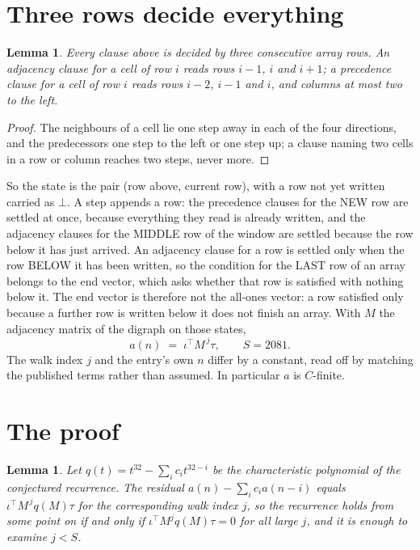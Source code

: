 \documentclass[11pt,a4paper]{article}
\theoremstyle{plain}
\newtheorem{lemma}[theorem]{Lemma}
\theoremstyle{definition}
\begin{document}
\section{Three rows decide everything}

\begin{lemma}\label{lem:win}
Every clause above is decided by three consecutive array rows. An adjacency clause for a cell
of row $i$ reads rows $i-1$, $i$ and $i+1$; a precedence clause for a cell of row $i$ reads
rows $i-2$, $i-1$ and $i$, and columns at most two to the left.
\end{lemma}

\begin{proof}
The neighbours of a cell lie one step away in each of the four directions, and the predecessors
one step to the left or one step up; a clause naming two cells in a row or column reaches two
steps, never more.
\end{proof}

So the state is the pair (row above, current row), with a row not yet written carried as
$\bot$. A step appends a row: the precedence clauses for the NEW row are settled at once,
because everything they read is already written, and the adjacency clauses for the MIDDLE row
of the window are settled because the row below it has just arrived. An adjacency clause for a row is settled only when the row BELOW it has been
written, so the condition for the LAST row of an array belongs to the end vector, which asks
whether that row is satisfied with nothing below it. The end vector is therefore not the
all-ones vector: a row satisfied only because a further row is written below it does not
finish an array. With $M$ the
adjacency matrix of the digraph on those states,
\[
a(n)\;=\;\iota^{\!\top}M^{\,j}\tau ,\qquad S=2081.
\]
The walk index $j$ and the entry's own $n$ differ by a constant, read off by matching the
published terms rather than assumed. In particular $a$ is $C$-finite.

\section{The proof}

\begin{lemma}\label{lem:crit}
Let $q(t)=t^{32}-\sum_i c_it^{32-i}$ be the characteristic polynomial of the
conjectured recurrence. The residual $a(n)-\sum_ic_ia(n-i)$ equals
$\iota^{\!\top}M^{\,j}q(M)\tau$ for the corresponding walk index $j$, so the recurrence
holds from some point on if and only if $\iota^{\!\top}M^{j}q(M)\tau=0$ for all large $j$,
and it is enough to examine $j<S$.
\end{lemma}
\end{document}
